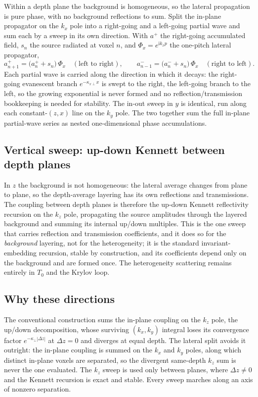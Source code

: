 \documentclass[11pt,a4paper]{article}
\newcommand{\ii}{\mathrm{i}}
\newcommand{\Tz}{T_0}
\begin{document}
Within a depth plane the background is homogeneous, so the lateral propagation is pure phase,
with no background reflections to sum. Split the in-plane propagator on the $k_x$ pole into a
right-going and a left-going partial wave and sum each by a sweep in its own direction. With
$a^+$ the right-going accumulated field, $s_n$ the source radiated at voxel $n$, and
$\Phi_x=e^{\ii k_x p}$ the one-pitch lateral propagator,
\begin{equation}
\label{eq:sweep}
a^+_{n+1}=\big(a^+_n+s_n\big)\,\Phi_x \quad(\text{left to right}),
\qquad
a^-_{n-1}=\big(a^-_n+s_n\big)\,\Phi_x \quad(\text{right to left}).
\end{equation}
Each partial wave is carried along the direction in which it decays: the right-going evanescent
branch $e^{-\kappa_{x\perp}x}$ is swept to the right, the left-going branch to the left, so the
growing exponential is never formed and no reflection/transmission bookkeeping is needed for
stability. The in-out sweep in $y$ is identical, run along each constant-$(z,x)$ line on the
$k_y$ pole. The two together sum the full in-plane partial-wave series as nested
one-dimensional phase accumulations.

\subsection{Vertical sweep: up-down Kennett between depth planes}

In $z$ the background is not homogeneous: the lateral average changes from plane to plane, so
the depth-average layering has its own reflections and transmissions. The coupling between
depth planes is therefore the up-down Kennett reflectivity recursion \cite{Kennett1983} on the
$k_z$ pole, propagating the source amplitudes through the layered background and summing its
internal up/down multiples. This is the one sweep that carries reflection and transmission
coefficients, and it does so for the \emph{background} layering, not for the heterogeneity; it
is the standard invariant-embedding recursion, stable by construction, and its coefficients
depend only on the background and are formed once. The heterogeneity scattering remains entirely
in $\Tz$ and the Krylov loop.

\subsection{Why these directions}
\label{sec:why}

The conventional construction sums the in-plane coupling on the $k_z$ pole, the up/down
decomposition, whose surviving $(k_x,k_y)$ integral loses its convergence factor
$e^{-\kappa_\perp|\Delta z|}$ at $\Delta z=0$ and diverges at equal depth. The lateral split
avoids it outright: the in-plane coupling is summed on the $k_x$ and $k_y$ poles, along which
distinct in-plane voxels are separated, so the divergent same-depth $k_z$ sum is never the one
evaluated. The $k_z$ sweep is used only between planes, where $\Delta z\neq 0$ and the Kennett
recursion is exact and stable. Every sweep marches along an axis of nonzero separation.
\end{document}
